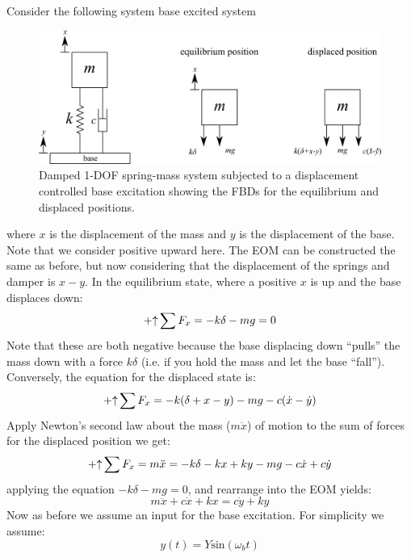 \documentclass[12pt,letter]{article}
\begin{document}
	Consider the following system base excited system
	\begin{figure}[H]
		\centering
		\includegraphics[]{../figures/1_DOF_spring_dashpot_mass_vertical_base_excited_FBD.png}
		\caption{Damped 1-DOF spring-mass system subjected to a displacement controlled base excitation showing the FBDs for the equilibrium and displaced positions.}
		\label{fig:1_DOF_spring_dashpot_mass_vertical_base_excited_FBD}
	\end{figure}
	where $x$ is the displacement of the mass and $y$ is the displacement of the base. Note that we consider positive upward here. The EOM can be constructed the same as before, but now considering that the displacement of the springs and damper is $x-y$.  In the equilibrium state, where a positive $x$ is up and the base displaces down:
	\begin{equation}
	\mathbin{+\mathord\uparrow} \sum F_x = -k\delta -mg =0
	\end{equation}	
	Note that these are both negative because the base displacing down ``pulls'' the mass down with a force $k\delta$ (i.e. if you hold the mass and let the base ``fall''). Conversely, the equation for the displaced state is:
	\begin{equation}
	\mathbin{+\mathord\uparrow} \sum F_x = -k(\delta + x - y) -mg -c(\dot{x} -\dot{y})
	\end{equation}	
	Apply Newton's second law about the mass ($m\ddot{x}$) of motion to the sum of forces for the displaced position we get:
	\begin{equation}
	\mathbin{+\mathord\uparrow} \sum F_x = m\ddot{x} = -k\delta -kx + ky -mg -c\dot{x} +c\dot{y}
	\end{equation}	
	applying the equation $-k\delta -mg =0$, and rearrange into the EOM yields:	
	\begin{equation}
	m\ddot{x} + c\dot{x} + kx = c\dot{y} + ky 
	\end{equation}
	Now as before we assume an input for the base excitation. For simplicity we assume:
	\begin{equation}
	y(t) = Y\text{sin}(\omega_b t)
	\end{equation}
\end{document}
